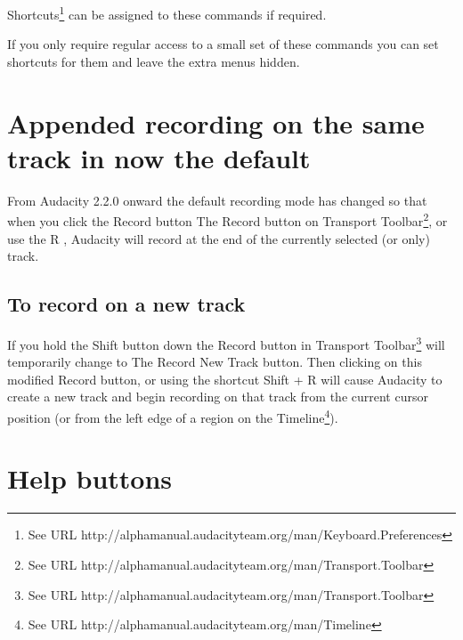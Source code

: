 Shortcuts\footnote{See URL http://alphamanual.audacityteam.org/man/Keyboard.Preferences} can be assigned to these commands if required.

If you only require regular access to a small set of these commands you can set shortcuts for them and leave the extra menus hidden.





\section{
Appended recording on the same track in now the default
}


From Audacity 2.2.0 onward the default recording mode has changed so that when you click the Record button The Record button on Transport Toolbar\footnote{See URL http://alphamanual.audacityteam.org/man/Transport.Toolbar}, or use the 
R
, Audacity will record at the end of the currently selected (or only) track.

\subsection{
To record on a new track
}


If you hold the 
Shift
 button down the Record button in Transport Toolbar\footnote{See URL http://alphamanual.audacityteam.org/man/Transport.Toolbar} will temporarily change to The Record New Track button. Then clicking on this modified Record button, or using the shortcut 
Shift + R
 will cause Audacity to create a new track and begin recording on that track from the current cursor position (or from the left edge of a region on the Timeline\footnote{See URL http://alphamanual.audacityteam.org/man/Timeline}). 




\section{
Help buttons
}



